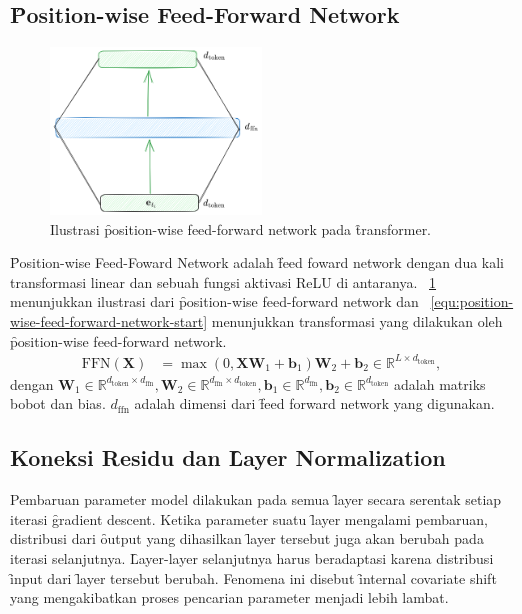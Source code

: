 \subsection{\f{Position-wise Feed-Forward Network}}
	\begin{figure}[!ht]
		\centering
		\includegraphics[width=0.5\textwidth]{assets/pics/ffn_transformer.png}
		\caption{Ilustrasi \f{position-wise feed-forward network} pada \f{transformer}.}
		\label{fig:position-wise-feed-forward-network}
	\end{figure}
	\f{Position-wise Feed-Foward Network} adalah \f{feed foward network} dengan dua kali transformasi linear dan sebuah fungsi aktivasi ReLU di antaranya. \pic~\ref{fig:position-wise-feed-forward-network} menunjukkan ilustrasi dari \f{position-wise feed-forward network} dan \equ~\ref{equ:position-wise-feed-forward-network-start} menunjukkan transformasi yang dilakukan oleh \f{position-wise feed-forward network}.
	\begin{align}
		\label{equ:position-wise-feed-forward-network-start}
		\text{FFN}(\mathbf{X}) &= \max(0, \mathbf{X}\mathbf{W}_1 + \mathbf{b}_1)\mathbf{W}_2 + \mathbf{b}_2 \in \mathbb{R}^{L \times d_{\text{token}}},
	\end{align}
	dengan $\mathbf{W}_1 \in \mathbb{R}^{d_{\text{token}} \times d_{\text{ffn}}}, \mathbf{W}_2 \in \mathbb{R}^{d_{\text{ffn}} \times d_{\text{token}}}, \mathbf{b}_1 \in \mathbb{R}^{d_{\text{ffn}}}, \mathbf{b}_2 \in \mathbb{R}^{d_{\text{token}}}$ adalah matriks bobot dan bias. $d_{\text{ffn}}$ adalah dimensi dari \f{feed forward network} yang digunakan.

	\subsection{Koneksi Residu dan \f{Layer Normalization}}
	\label{sec:layer-normalization}

	Pembaruan parameter model dilakukan pada semua \f{layer} secara serentak setiap iterasi \f{gradient descent}. Ketika parameter suatu \f{layer} mengalami pembaruan, distribusi dari \f{output} yang dihasilkan \f{layer} tersebut juga akan berubah pada iterasi selanjutnya. \f{Layer-layer} selanjutnya harus beradaptasi karena distribusi \f{input} dari \f{layer} tersebut berubah. Fenomena ini disebut \f{internal covariate shift} yang mengakibatkan proses pencarian parameter menjadi lebih lambat.
	
